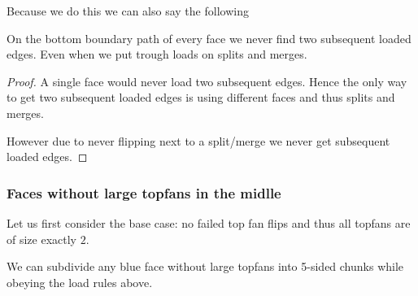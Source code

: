 Because we do this we can also say the following

\begin{lemma}
  \label{lm:}
  On the bottom boundary path of every face we never find two subsequent loaded edges. Even when we put trough loads on splits and merges.
\end{lemma}
\begin{proof}
  A single face would never load two subsequent edges. Hence the only way to get two subsequent loaded edges is using different faces and thus splits and merges.

  However due to never flipping next to a split/merge we never get subsequent loaded edges.
\end{proof}


\subsubsection{Faces without large topfans in the midlle}
Let us first consider the base case: no failed top fan flips and thus all topfans are of size exactly $2$.

\begin{lemma}
  \label{lm:subdiv:withoutTopfan}
  We can subdivide any blue face without large topfans into 5-sided chunks while obeying the load rules above.
\end{lemma}

